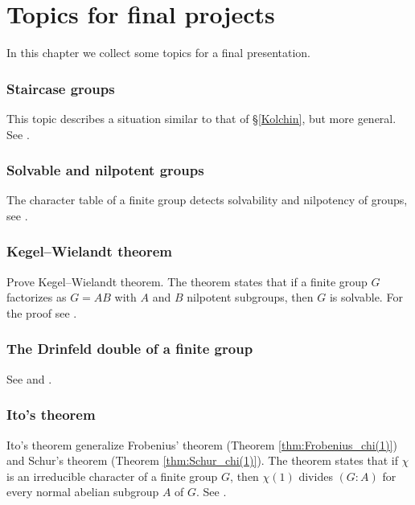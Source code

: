 \chapter*{Topics for final projects}

\pagestyle{plain}
\fancyhf{}
\fancyfoot[CE,CO]{\leftmark}
\fancyfoot[LE,RO]{\thepage}


In this chapter we collect some topics for a final presentation. 

\subsection*{Staircase groups}

This topic describes a situation similar to that of \S\ref{Kolchin}, but
more general. See \cite[Chapter 5]{MR1369573}.

\subsection*{Solvable and nilpotent groups}

The character table of a finite group
detects solvability and nilpotency of groups, see
\cite[Chapter 6]{MR1369573}.

\subsection*{Kegel--Wielandt theorem}

Prove Kegel--Wielandt theorem. The theorem states that if a finite group 
$G$ factorizes as $G=AB$ with $A$ and $B$ nilpotent subgroups, then $G$ 
is solvable. For the proof see 
\cite[Theorem 2.13]{MR1211633}. 

\subsection*{The Drinfeld double of a finite group}

See \cite[Chapter IX]{MR1321145} and 
\cite[Chapter 8]{MR3752618}.

\subsection*{Ito's theorem}

Ito's theorem generalize Frobenius' theorem
(Theorem \ref{thm:Frobenius_chi(1)})  
and Schur's theorem (Theorem \ref{thm:Schur_chi(1)}). 
The theorem states that if $\chi$ is an irreducible character
of a finite group $G$, then $\chi(1)$ divides 
$(G:A)$ for every normal abelian subgroup $A$ of $G$. 
See \cite[\S8.1]{MR0450380}. 

